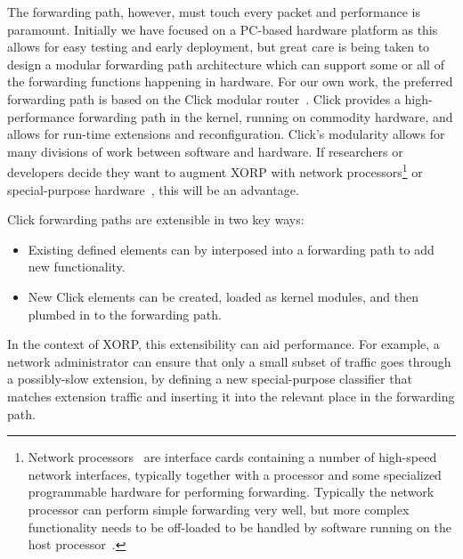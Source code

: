 The forwarding path, however, must touch every packet and performance
is paramount.  Initially we have focused on a PC-based hardware
platform as this allows for easy testing and early deployment, but
great care is being taken to design a modular forwarding path
architecture which can support some or all of the forwarding functions
happening in hardware.  For our own work, the preferred forwarding
path is based on the Click modular router~\cite{click}.  Click
provides a high-performance forwarding path in the kernel, 
running on commodity hardware, and
allows for run-time extensions and reconfiguration.  Click's
modularity allows for many divisions of work between software and
hardware.  If researchers or developers decide they want to augment
XORP with network processors\footnote{Network processors~\cite{ixp1200} are interface
cards containing a number of high-speed network interfaces, typically
together with a processor and some specialized programmable hardware
for performing forwarding.  Typically the network processor can
perform simple forwarding very well, but more complex functionality
needs to be off-loaded to be handled by software running on the host
processor~\cite{scoutixp}.} or 
special-purpose hardware~\cite{fpx}, this will
be an advantage.

Click forwarding paths are extensible in two key ways:
\begin{itemize}
\vspace{-0.07in}
\item Existing defined elements can by interposed into a forwarding
path to add new functionality.
\vspace{-0.07in}
\item New Click elements can be created, loaded as kernel modules, and
then plumbed in to the forwarding path.
\vspace{-0.07in}
\end{itemize}
In the context of XORP, this extensibility can aid performance.
For example, a network administrator can ensure that only a small subset of
traffic goes through a possibly-slow extension, by defining
a new special-purpose classifier that matches extension traffic and 
inserting it into
the relevant place in the forwarding path.


